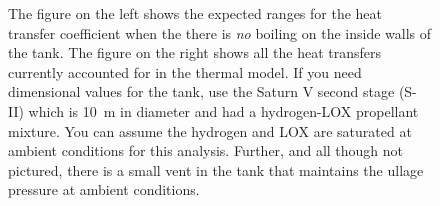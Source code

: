 \documentclass[12pt,letterpaper]{article}
\begin{document}
\begin{figure}[!htpb]
	\centering
	
	\caption{The figure on the left shows the expected ranges for the heat transfer coefficient when the there is \textit{no} boiling on the inside walls of the tank.
		The figure on the right shows all the heat transfers currently accounted for in the thermal model.
		If you need dimensional values for the tank, use the Saturn V second stage (S-II) which is \SI{10}{\meter} in diameter and had a hydrogen-LOX propellant mixture.
		You can assume the hydrogen and LOX are saturated at ambient conditions for this analysis.
		Further, and all though not pictured, there is a small vent in the tank that maintains the ullage pressure at ambient conditions.}
\end{figure}
\end{document}
